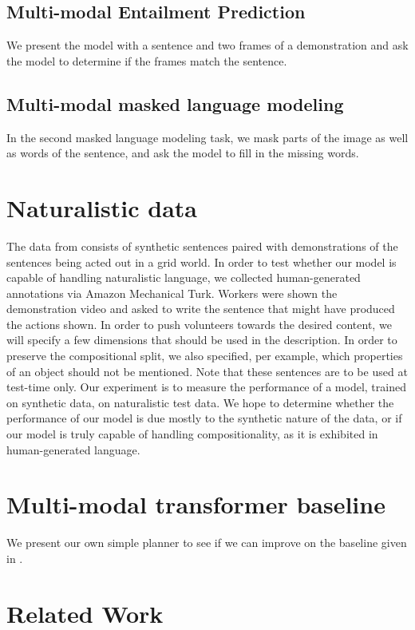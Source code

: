 \documentclass[11pt]{article}
\begin{document}
\subsection*{Multi-modal Entailment Prediction}
%
We present the model with a sentence and two frames of a demonstration and ask the model to determine if the frames match the sentence.

\subsection{Multi-modal masked language modeling}
%
In the second masked language modeling task, we mask parts of the image as well as words of the sentence, and ask the model to fill in the missing words.

\section{Naturalistic data}

The data from \citet{ruis2020benchmark} consists of synthetic sentences paired with demonstrations of the sentences being acted out in a grid world.
%
In order to test whether our model is capable of handling naturalistic language, we collected human-generated annotations via Amazon Mechanical Turk.
%
Workers were shown the demonstration video and asked to write the sentence that might have produced the actions shown.
%
In order to push volunteers towards the desired content, we will specify a few dimensions that should be used in the description.
%
In order to preserve the compositional split, we also specified, per example, which properties of an object should not be mentioned.
%
Note that these sentences are to be used at test-time only.
%
Our experiment is to measure the performance of a model, trained on synthetic data, on naturalistic test data.
%
We hope to determine whether the performance of our model is due mostly to the synthetic nature of the data, or if our model is truly capable of handling compositionality, as it is exhibited in human-generated language. 

\section{Multi-modal transformer baseline}
\label{transformer-planner}
We present our own simple planner to see if we can improve on the baseline given in \cite{ruis2020benchmark}.

\section{Related Work}
\end{document}
